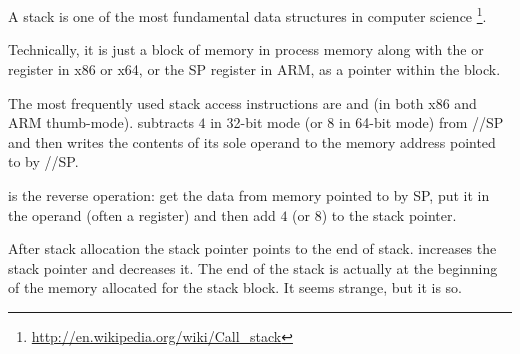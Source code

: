 \chapter{\Stack}
\label{sec:stack}
\index{\Stack}

{A stack is one of the most fundamental data structures in computer science}
\footnote{\url{http://en.wikipedia.org/wiki/Call_stack}}.

{Technically, it is just a block of memory in process memory along with the \ESP or \RSP register in x86 or x64, or the \ac{SP} register in ARM, as a pointer within the block.}

{The most frequently used stack access instructions are \PUSH and \POP (in both x86 and ARM thumb-mode). 
\PUSH subtracts $4$ in 32-bit mode (or $8$ in 64-bit mode) from \ESP/\RSP/\ac{SP} and then writes the contents of its sole operand to the memory address pointed to by \ESP/\RSP/\ac{SP}.} 

{\POP is the reverse operation: get the data from memory pointed to by \ac{SP}, 
put it in the operand (often a register) and then add $4$ (or $8$) to the \gls{stack pointer}.}

{After stack allocation the \gls{stack pointer} points to the end of stack.}
{\PUSH increases the \gls{stack pointer} and \POP decreases it.}
{The end of the stack is actually at the beginning of the memory allocated for the stack block. 
It seems strange, but it is so.}

